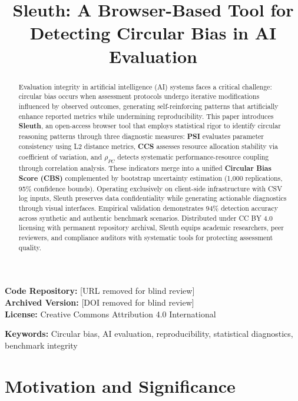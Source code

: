 \documentclass[10pt]{article}
\title{Sleuth: A Browser-Based Tool for Detecting Circular Bias in AI Evaluation}
\author{} %
\date{}
\begin{document}
\maketitle


\noindent\textbf{Code Repository:} [URL removed for blind review] \\
\textbf{Archived Version:} [DOI removed for blind review] \\
\textbf{License:} Creative Commons Attribution 4.0 International

\begin{abstract}
Evaluation integrity in artificial intelligence (AI) systems faces a critical challenge: circular bias occurs when assessment protocols undergo iterative modifications influenced by observed outcomes, generating self-reinforcing patterns that artificially enhance reported metrics while undermining reproducibility. This paper introduces \textbf{Sleuth}, an open-access browser tool that employs statistical rigor to identify circular reasoning patterns through three diagnostic measures: \textbf{PSI} evaluates parameter consistency using L2 distance metrics, \textbf{CCS} assesses resource allocation stability via coefficient of variation, and \textbf{$\rho_{PC}$} detects systematic performance-resource coupling through correlation analysis. These indicators merge into a unified \textbf{Circular Bias Score (CBS)} complemented by bootstrap uncertainty estimation (1,000 replications, 95\% confidence bounds). Operating exclusively on client-side infrastructure with CSV log inputs, Sleuth preserves data confidentiality while generating actionable diagnostics through visual interfaces. Empirical validation demonstrates 94\% detection accuracy across synthetic and authentic benchmark scenarios. Distributed under CC BY 4.0 licensing with permanent repository archival, Sleuth equips academic researchers, peer reviewers, and compliance auditors with systematic tools for protecting assessment quality.
\end{abstract}

\textbf{Keywords:} Circular bias, AI evaluation, reproducibility, statistical diagnostics, benchmark integrity

\section{Motivation and Significance}
\end{document}
